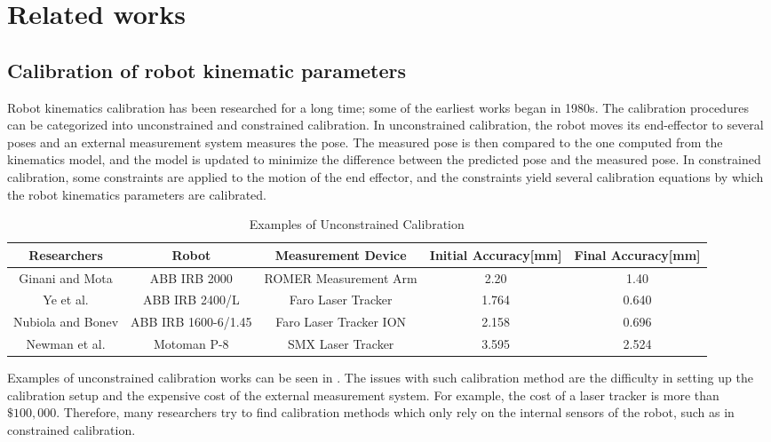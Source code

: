 \section{Related works}
\label{sec:related}
\subsection{Calibration of robot kinematic parameters}
\label{sec:kine_calib}
Robot kinematics calibration has been researched for a long time; some of the earliest works began in 1980s. The calibration procedures can be categorized into unconstrained and constrained calibration. In unconstrained calibration, the robot moves its end-effector to several poses and an external measurement system measures the pose. The measured pose is then compared to the one computed from the kinematics model, and the model is updated to minimize the difference between the predicted pose and the measured pose. In constrained calibration, some constraints are applied to the motion of the end effector, and the constraints yield several calibration equations by which the robot kinematics parameters are calibrated. 

\renewcommand{\arraystretch}{1.5}
\begin{table*}[htp]
\caption{Examples of Unconstrained Calibration}
\label{tab:unconstrained_calib}
\centering
\begin{tabular}{c c c c c}
\toprule
\textbf{Researchers} &  \textbf{Robot} & \textbf{Measurement Device} &  \textbf{Initial Accuracy[mm]}  & \textbf{Final Accuracy[mm]}\\
\midrule
Ginani and Mota \cite{Ginani2011} & ABB IRB 2000 & ROMER Measurement Arm & 2.20 & 1.40 \\
Ye et al. \cite{Ye2006} & ABB IRB 2400/L & Faro Laser Tracker & 1.764 & 0.640 \\
Nubiola and Bonev \cite{Nubiola2013} & ABB IRB 1600-6/1.45 & Faro Laser Tracker ION & 2.158 & 0.696 \\ 
Newman et al. \cite{Newman2000} & Motoman P-8 & SMX Laser Tracker & 3.595 & 2.524\\
\bottomrule
\end{tabular}
\end{table*}


Examples of unconstrained calibration works can be seen in . The issues with such calibration method are the difficulty in setting up the calibration setup and the expensive cost of the external measurement system. For example, the cost of a laser tracker is more than $\$100,000$\cite{Nubiola2013}. Therefore, many researchers try to find calibration methods which only rely on the internal sensors of the robot, such as in constrained calibration. 


